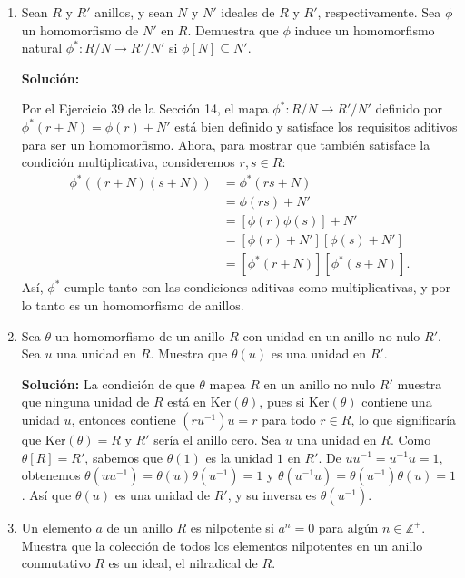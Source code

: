 \begin{enumerate}
\item Sean \(R\) y \(R'\) anillos, y sean \(N\) y \(N'\) ideales de \(R\) y \(R'\), respectivamente. Sea \(\phi\) un homomorfismo de \(N'\) en \(R\). Demuestra que \(\phi\) induce un homomorfismo natural \(\phi^* : R/N \rightarrow R'/N'\) si \(\phi[N] \subseteq N'\).
    
\textbf{Solución:}
    
    Por el Ejercicio 39 de la Sección 14, el mapa \(\phi^* : R/N \rightarrow R'/N'\) definido por \(\phi^*(r + N) = \phi(r) + N'\) está bien definido y satisface los requisitos aditivos para ser un homomorfismo. Ahora, para mostrar que también satisface la condición multiplicativa, consideremos \(r, s \in R\):
    \begin{align*}
        \phi^*((r+N)(s+N)) &= \phi^*(rs + N) \\
        &= \phi(rs) + N' \\
        &= [\phi(r)\phi(s)] + N' \\
        &= [\phi(r) + N'][\phi(s) + N'] \\
        &= [\phi^*(r + N)][\phi^*(s + N)].
    \end{align*}
    Así, \(\phi^*\) cumple tanto con las condiciones aditivas como multiplicativas, y por lo tanto es un homomorfismo de anillos.



\item  Sea $\theta$ un homomorfismo de un anillo $R$ con unidad en un anillo no nulo $R'$. Sea $u$ una unidad en $R$. Muestra que $\theta(u)$ es una unidad en $R'$.

\textbf{Solución:}
 La condición de que $\theta$ mapea $R$ en un anillo no nulo $R'$ muestra que ninguna unidad de $R$ está en Ker$(\theta)$, pues si Ker$(\theta)$ contiene una unidad $u$, entonces contiene $(ru^{-1})u = r$ para todo $r \in R$, lo que significaría que Ker$(\theta) = R$ y $R'$ sería el anillo cero. Sea $u$ una unidad en $R$. Como $\theta[R] = R'$, sabemos que $\theta(1)$ es la unidad $1$ en $R'$. De $uu^{-1} = u^{-1}u = 1$, obtenemos $\theta(uu^{-1}) = \theta(u)\theta(u^{-1}) = 1$ y $\theta(u^{-1}u) = \theta(u^{-1})\theta(u) = 1$. Así que $\theta(u)$ es una unidad de $R'$, y su inversa es $\theta(u^{-1})$.

\item Un elemento $a$ de un anillo $R$ es nilpotente si $a^n = 0$ para algún $n \in \mathbb{Z^+}$. Muestra que la colección de todos los elementos nilpotentes en un anillo conmutativo $R$ es un ideal, el nilradical de $R$.


\end{enumerate}
